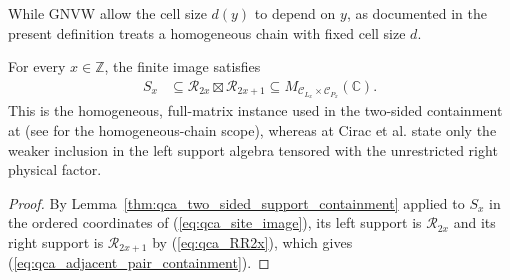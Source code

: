 \begin{definition}
    While GNVW allow the cell size $d(y)$ to depend on $y$, as documented in \cite{gap:gnvw12_site_dependent_adjacent_generation_scope} the present
    definition treats a homogeneous chain with fixed cell size
    $d$.
\end{definition}

\begin{lemma}
    \label{thm:qca_adjacent_pair_support_containment}
    \leanok
    For every $x\in\mathbb Z$, the finite image satisfies
    \begin{align}
        S_x
         & \subseteq
        \mathcal R_{2x}\boxtimes\mathcal R_{2x+1}
        \subseteq
        M_{\mathcal C_{L_x}\times\mathcal C_{P_x}}(\mathbb C).
        \label{eq:qca_adjacent_pair_containment}
    \end{align}
    This is the homogeneous, full-matrix instance used in the two-sided
    containment at
    \cite[lines~1276--1278]{Gross2012IndexTheory} (see \cite{gap:gnvw12_site_dependent_adjacent_generation_scope} for the homogeneous-chain scope),
    whereas
    at \cite[lines~2322--2328]{Cirac2017MPU} Cirac et al. state only the weaker inclusion in the left support algebra
    tensored with the unrestricted right physical
    factor.
\end{lemma}

\begin{proof}\leanok
    By Lemma~\ref{thm:qca_two_sided_support_containment} applied to $S_x$ in
    the ordered coordinates of (\ref{eq:qca_site_image}), its left support
    is $\mathcal R_{2x}$ and its right support is
    $\mathcal R_{2x+1}$ by (\ref{eq:qca_RR2x}), which gives
    (\ref{eq:qca_adjacent_pair_containment}).
\end{proof}

